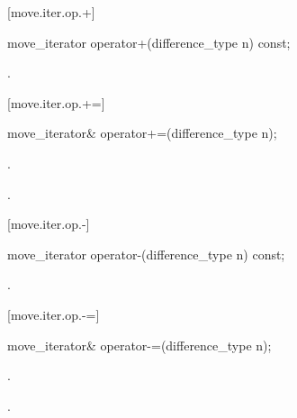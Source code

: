[move.iter.op.+]{}

%
%
\begin{itemdecl}
move_iterator operator+(difference_type n) const;
\end{itemdecl}

\begin{itemdescr}
\pnum
\returns {}.
\end{itemdescr}

[move.iter.op.+=]{}

%
%
\begin{itemdecl}
move_iterator& operator+=(difference_type n);
\end{itemdecl}

\begin{itemdescr}
\pnum
\effects {}.

\pnum
\returns {}.
\end{itemdescr}

[move.iter.op.-]{}

%
%
\begin{itemdecl}
move_iterator operator-(difference_type n) const;
\end{itemdecl}

\begin{itemdescr}
\pnum
\returns {}.
\end{itemdescr}

[move.iter.op.-=]{}

%
%
\begin{itemdecl}
move_iterator& operator-=(difference_type n);
\end{itemdecl}

\begin{itemdescr}
\pnum
\effects {}.

\pnum
\returns {}.
\end{itemdescr}

